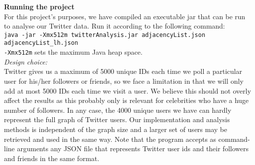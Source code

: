 \documentclass[letterpaper]{article}
\begin{document}
\noindent\textbf{Running the project}\\
For this project's purposes, we have compiled an executable jar that can be run to analyse our Twitter data. Run it according to the following command:\\

\texttt{java -jar -Xmx512m twitterAnalysis.jar adjacencyList.json}\\ \texttt{\indent\indent adjacencyList\_lh.json}\\

\noindent\texttt{-Xmx512m} sets the maximum Java heap space.\\

\noindent\textit{Design choice:}\\
Twitter gives us a maximum of 5000 unique IDs each time we poll a particular user for his/her followers or friends, so we face a limitation in that we will only add at most 5000 IDs each time we visit a user. We believe this should not overly affect the results as this probably only is relevant for celebrities who have a huge number of followers. In any case, the 4000 unique users we have can hardly represent the full graph of Twitter users. Our implementation and analysis methods is independent of the graph size and a larger set of users may be retrieved and used in the same way. Note that the program accepts as command-line arguments any JSON file that represents Twitter user ids and their followers and friends in the same format.
\end{document}
